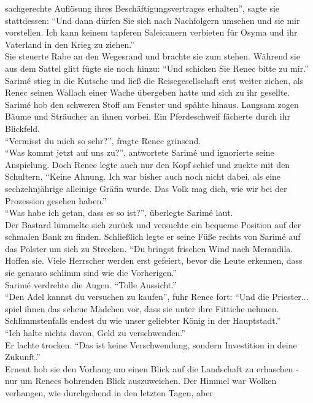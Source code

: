 sachgerechte Auflösung ihres Beschäftigungsvertrages erhalten'', sagte sie stattdessen: ``Und dann 
dürfen Sie sich nach Nachfolgern umsehen und sie mir vorstellen. Ich kann keinem tapferen 
Saleicanern verbieten für Osyma und ihr Vaterland in den Krieg zu ziehen.''\\
Sie steuerte Rabe an den Wegesrand und brachte sie zum stehen. Während sie aus dem Sattel glitt 
fügte sie noch hinzu: ``Und schicken Sie Renec bitte zu mir.''\\
Sarimé stieg in die Kutsche und ließ die Reisegesellschaft erst weiter ziehen, als Renec seinen 
Wallach einer Wache übergeben hatte und sich zu ihr gesellte. Sarimé hob den schweren Stoff am 
Fenster und spähte hinaus. Langsam zogen Bäume und Sträucher an ihnen vorbei. Ein Pferdeschweif 
fächerte durch ihr Blickfeld. \\
``Vermisst du mich so sehr?'', fragte Renec grinsend.\\
``Was kommt jetzt auf uns zu?'', antwortete Sarimé und ignorierte seine Anspielung.
Doch Renec legte auch nur den Kopf schief und zuckte mit den Schultern. ``Keine Ahnung. Ich war 
bisher auch noch nicht dabei, als eine sechzehnjährige alleinige Gräfin wurde. Das Volk mag dich, 
wie wir bei der Prozession gesehen haben.''\\
``Was habe ich getan, dass es so ist?'', überlegte Sarimé laut.\\
Der Bastard lümmelte sich zurück und versuchte ein bequeme Position auf der schmalen Bank zu 
finden. Schließlich legte er seine Füße rechts von Sarimé auf das Polster um sich zu Strecken. ``Du 
bringst frischen Wind nach Merandila. Hoffen sie. Viele Herrscher werden erst gefeiert, bevor die 
Leute erkennen, dass sie genauso schlimm sind wie die Vorherigen.''\\
Sarimé verdrehte die Augen. ``Tolle Aussicht.''\\
``Den Adel kannst du versuchen zu kaufen'', fuhr Renec fort: ``Und die Priester... spiel ihnen das 
scheue Mädchen vor, dass sie unter ihre Fittiche nehmen. Schlimmstenfalls endest du wie unser 
geliebter König in der Hauptstadt.''\\
``Ich halte nichts davon, Geld zu verschwenden.''\\
Er lachte trocken. ``Das ist keine Verschwendung, sondern Investition in deine Zukunft.''\\
Erneut hob sie den Vorhang um einen Blick auf die Landschaft zu erhaschen - nur um Renecs bohrenden 
Blick auszuweichen. Der Himmel war Wolken verhangen, wie durchgehend in den letzten Tagen, aber 
